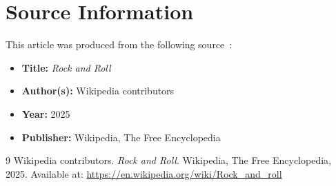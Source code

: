 \documentclass[12pt,a4paper]{article}
\begin{document}
\section{Source Information}

This article was produced from the following
source~\cite{wikipedia2025}:

\begin{itemize}
  \item \textbf{Title:} \textit{Rock and Roll}
  \item \textbf{Author(s):} Wikipedia contributors
  \item \textbf{Year:} 2025
  \item \textbf{Publisher:} Wikipedia, The Free Encyclopedia
\end{itemize}

\begin{thebibliography}{9}
Wikipedia contributors.
\textit{Rock and Roll}.
Wikipedia, The Free Encyclopedia, 2025.
Available at: \url{https://en.wikipedia.org/wiki/Rock\_and\_roll}
\end{thebibliography}
\end{document}
